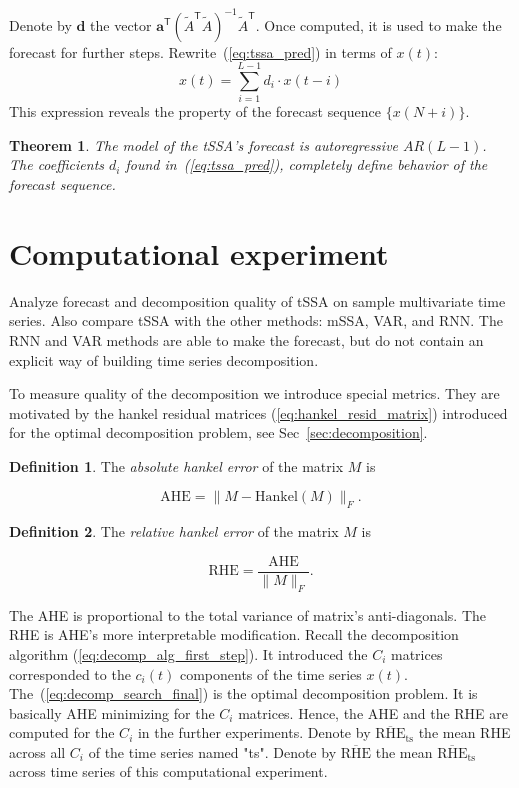 \documentclass[referee, pdflatex, sn-mathphys-num]{sn-jnl}
\theoremstyle{definition}
\newtheorem{Def}{Definition}
\theoremstyle{plain}
\newtheorem{Th}{Theorem}
\begin{document}
	Denote by $ \mathbf{d} $ the vector $ \mathbf{a}^{\mathsf{T}} (\tilde{A}^{\mathsf{T}} \tilde{A})^{-1} \tilde{A}^{\mathsf{T}} $. Once computed, it is used to make the forecast for further steps. Rewrite~(\ref{eq:tssa_pred}) in terms of $ x(t) $: \begin{equation*}\label{eq:autoregr}
		x(t) = \sum\limits_{i = 1}^{L - 1} d_i \cdot x(t - i)
	\end{equation*}	This expression reveals the property of the forecast sequence $ \{x(N + i)\} $.
	
	\begin{Th}\label{th:forecast}		
		The model of the tSSA's forecast is \emph{autoregressive} $ AR(L - 1) $. The coefficients $ d_i $ found in~(\ref{eq:tssa_pred}), completely define behavior of the forecast sequence.
	\end{Th}
	
	\section{Computational experiment}	
	
	Analyze forecast and decomposition quality of tSSA on sample multivariate time series. Also compare tSSA with the other methods: mSSA, VAR, and RNN. The RNN and VAR methods are able to make the forecast, but do not contain an explicit way of building time series decomposition.
	
	To measure quality of the decomposition we introduce special metrics. They are motivated by the hankel residual matrices (\ref{eq:hankel_resid_matrix}) introduced for the optimal decomposition problem, see Sec~\ref{sec:decomposition}.
	
	\begin{Def}
		The \emph{absolute hankel error} of the matrix $ M $ is 
		
		\[
		\text{AHE} = \lVert M - \text{Hankel}(M) \rVert_F.
		\] 
		
	\end{Def}	
	
	\begin{Def}		
		
		The \emph{relative hankel error} of the matrix $ M $ is 
		
		\[
		\text{RHE} = \frac{\text{AHE}}{\lVert M \rVert_F}.
		\] 		
		
	\end{Def}
	
	The AHE is proportional to the total variance of matrix's anti-diagonals. The RHE is AHE's more interpretable modification. Recall the decomposition algorithm (\ref{eq:decomp_alg_first_step}). It introduced the $ C_i $ matrices corresponded to the $ c_i(t) $ components of the time series $ x(t) $. The~(\ref{eq:decomp_search_final}) is the optimal decomposition problem. It is basically AHE minimizing for the $ C_i $ matrices. Hence, the AHE and the RHE are computed for the $ C_i $ in the further experiments. Denote by $ \overline{\text{RHE}}_{\text{ts}} $ the mean RHE across all $ C_i $ of the time series named "ts". Denote by $ \overline{\text{RHE}} $ the mean $ \overline{\text{RHE}}_{\text{ts}} $ across time series of this computational experiment.
	
\end{document}
